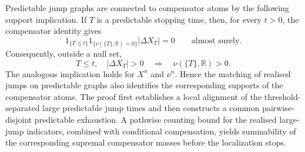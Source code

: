 \documentclass[a4paper,10pt]{article}
\begin{document}
Predictable jump graphs are connected to compensator atoms by the
following support implication. If \(T\) is a predictable stopping time, then, for every \(t>0\), the
compensator identity gives
\[
1_{\{T\le t\}}
1_{\{\nu(\{T\},\mathbb R)=0\}}
|\Delta X_T|
=
0
\qquad\text{almost surely}.
\]
Consequently, outside a null set,
\[
T\le t,\quad |\Delta X_T|>0
\quad\Longrightarrow\quad
\nu(\{T\},\mathbb R)>0.
\]
The analogous implication holds for \(X^n\) and \(\nu^n\). Hence the
matching of realised jumps on predictable graphs also identifies the
corresponding supports of the compensator atoms.
The proof first establishes a local alignment of the
threshold-separated large predictable jump times and then constructs a
common pairwise-disjoint predictable exhaustion. A pathwise counting
bound for the realised large-jump indicators, combined with conditional
compensation, yields summability of the corresponding supremal
compensator masses before the localization stops.
\end{document}
